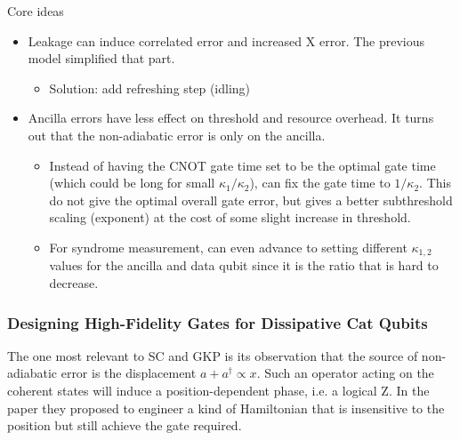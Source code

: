 \documentclass[a4paper,11pt]{article}
\begin{document}
Core ideas
\begin{itemize}
    \item Leakage can induce correlated error and increased X error. The previous model simplified that part.
    \begin{itemize}
        \item Solution: add refreshing step (idling)
    \end{itemize}
    \item Ancilla errors have less effect on threshold and resource overhead. It turns out that the non-adiabatic error is only on the ancilla.
    \begin{itemize}
        \item Instead of having the CNOT gate time set to be the optimal gate time (which could be long for small $\kappa_1/\kappa_2$), can fix the gate time to $1/\kappa_2$. This do not give the optimal overall gate error, but gives a better subthreshold scaling (exponent) at the cost of some slight increase in threshold.
        \item For syndrome measurement, can even advance to setting different $\kappa_{1,2}$ values for the ancilla and data qubit since it is the ratio that is hard to decrease.
    \end{itemize}
\end{itemize}

\subsubsection*{Designing High-Fidelity Gates for Dissipative Cat Qubits \cite{gautier_designing_2023}}


The one most relevant to SC and GKP is its observation that the source of non-adiabatic error is the displacement $a+a^\dagger\propto x$. Such an operator acting on the coherent states will induce a position-dependent phase, i.e. a logical Z. In the paper they proposed to engineer a kind of Hamiltonian that is insensitive to the position but still achieve the gate required. 





\end{document}
